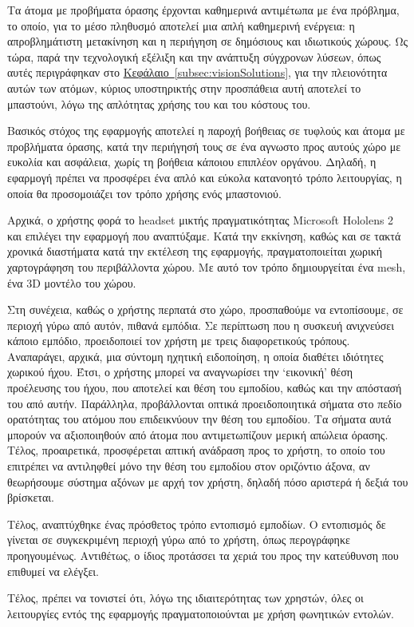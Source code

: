 Τα άτομα με προβήματα όρασης έρχονται καθημερινά αντιμέτωπα με ένα πρόβλημα, το οποίο, για το μέσο πληθυσμό αποτελεί μια απλή καθημερινή ενέργεια: η απροβλημάτιστη μετακίνηση και η περιήγηση σε δημόσιους και ιδιωτικούς χώρους. Ως τώρα, παρά την τεχνολογική εξέλιξη και την ανάπτυξη σύγχρονων λύσεων, όπως αυτές περιγράφηκαν στο \hyperref[subsec:visionSolutions]{Κεφάλαιο~\ref*{subsec:visionSolutions}}, για την πλειονότητα αυτών των ατόμων, κύριος υποστηρικτής στην προσπάθεια αυτή αποτελεί το μπαστούνι, λόγω της απλότητας χρήσης του και του κόστους του.

Βασικός στόχος της εφαρμογής αποτελεί η παροχή βοήθειας σε τυφλούς και άτομα με προβλήματα όρασης, κατά την περιήγησή τους σε ένα αγνωστο προς αυτούς χώρο με ευκολία και ασφάλεια, χωρίς τη βοήθεια κάποιου επιπλέον οργάνου. Δηλαδή, η εφαρμογή πρέπει να προσφέρει ένα απλό και εύκολα κατανοητό τρόπο λειτουργίας, η οποία θα προσομοιάζει τον τρόπο χρήσης ενός μπαστονιού.

Αρχικά, ο χρήστης φορά το headset μικτής πραγματικότητας Microsoft Hololens 2 και επιλέγει την εφαρμογή που αναπτύξαμε. Κατά την εκκίνηση, καθώς και σε τακτά χρονικά διαστήματα κατά την εκτέλεση της εφαρμογής, πραγματοποιείται χωρική χαρτογράφηση του περιβάλλοντα χώρου. Με αυτό τον τρόπο δημιουργείται ένα mesh, ένα 3D μοντέλο του χώρου.

Στη συνέχεια, καθώς ο χρήστης περπατά στο χώρο, προσπαθούμε να εντοπίσουμε, σε περιοχή γύρω από αυτόν, πιθανά εμπόδια. Σε περίπτωση που η συσκευή ανιχνεύσει κάποιο εμπόδιο, προειδοποιεί τον χρήστη με τρεις διαφορετικούς τρόπους. Αναπαράγει, αρχικά, μια σύντομη ηχητική ειδοποίηση, η οποία διαθέτει ιδιότητες χωρικού ήχου. Έτσι, ο χρήστης μπορεί να αναγνωρίσει την `εικονική' θέση προέλευσης του ήχου, που αποτελεί και θέση του εμποδίου, καθώς και την απόστασή του από αυτήν. Παράλληλα, προβάλλονται οπτικά προειδοποιητικά σήματα στο πεδίο ορατότητας του ατόμου που επιδεικνύουν την θέση του εμποδίου. Τα σήματα αυτά μπορούν να αξιοποιηθούν από άτομα που αντιμετωπίζουν μερική απώλεια όρασης. Τέλος, προαιρετικά, προσφέρεται απτική ανάδραση προς το χρήστη, το οποίο του επιτρέπει να αντιληφθεί μόνο την θέση του εμποδίου στον οριζόντιο άξονα, αν θεωρήσουμε σύστημα αξόνων με αρχή τον χρήστη, δηλαδή πόσο αριστερά ή δεξιά του βρίσκεται.

Τέλος, αναπτύχθηκε ένας πρόσθετος τρόπο εντοπισμό εμποδίων. Ο εντοπισμός δε γίνεται σε συγκεκριμένη περιοχή γύρω από το χρήστη, όπως περογράφηκε προηγουμένως. Αντιθέτως, ο ίδιος προτάσσει τα χεριά του προς την κατεύθυνση που επιθυμεί να ελέγξει.

Τέλος, πρέπει να τονιστεί ότι, λόγω της ιδιαιτερότητας των χρηστών, όλες οι λειτουργίες εντός της εφαρμογής πραγματοποιούνται με χρήση φωνητικών εντολών.